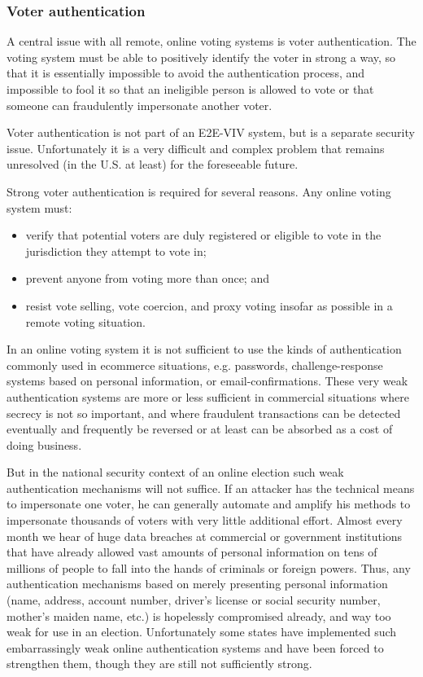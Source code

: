 \subsubsection{Voter authentication}

A central issue with all remote, online voting systems is voter
authentication. The voting system must be able to positively identify
the voter in strong a way, so that it is essentially impossible to
avoid the authentication process, and impossible to fool it so that an
ineligible person is allowed to vote or that someone can fraudulently
impersonate another voter.

Voter authentication is not part of an E2E-VIV system, but is a
separate security issue. Unfortunately it is a very difficult and
complex problem that remains unresolved (in the U.S. at least) for the
foreseeable future.

Strong voter authentication is required for several reasons. Any
online voting system must:

\begin{itemize}
\item verify that potential voters are duly registered or eligible to
  vote in the jurisdiction they attempt to vote in;
\item prevent anyone from voting more than once; and
\item resist vote selling, vote coercion, and proxy voting insofar as
  possible in a remote voting situation.
\end{itemize}

In an online voting system it is not sufficient to use the kinds of
authentication commonly used in ecommerce situations, e.g. passwords,
challenge-response systems based on personal information, or
email-confirmations. These very weak authentication systems are more
or less sufficient in commercial situations where secrecy is not so
important, and where fraudulent transactions can be detected
eventually and frequently be reversed or at least can be absorbed as a
cost of doing business. 

But in the national security context of an online election such weak
authentication mechanisms will not suffice. If an attacker has the
technical means to impersonate one voter, he can generally automate
and amplify his methods to impersonate thousands of voters with very
little additional effort. Almost every month we hear of huge data
breaches at commercial or government institutions that have already
allowed vast amounts of personal information on tens of millions of
people to fall into the hands of criminals or foreign powers. Thus,
any authentication mechanisms based on merely presenting personal
information (name, address, account number, driver’s license or social
security number, mother’s maiden name, etc.) is hopelessly compromised
already, and way too weak for use in an election. Unfortunately some
states have implemented such embarrassingly weak online authentication
systems and have been forced to strengthen them, though they are still
not sufficiently strong.

